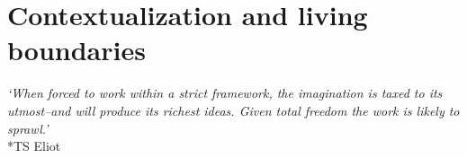 \documentclass[12pt]{article}
\begin{document}















\section{Contextualization and living boundaries}

\begin{center}
\textit{`When forced to work within a strict framework, the imagination is taxed to its utmost--and will produce its richest ideas. Given total freedom the work is likely to sprawl.'}\\*TS Eliot
\end{center}
\end{document}
